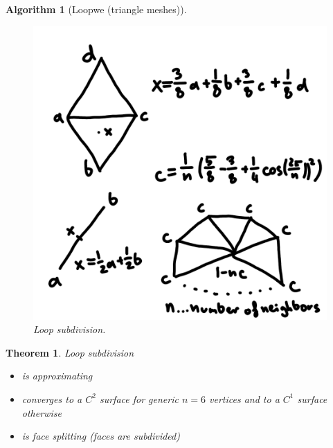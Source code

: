 \documentclass[]{article}
\newtheorem{theorem}{Theorem}
\newtheorem{algorithm}{Algorithm}
\begin{document}
\begin{algorithm}[Loopwe (triangle meshes)]
	\begin{figure}[h!]
		\centering
		\includegraphics[width=0.3\linewidth]{figures/loop}
		\caption{Loop subdivision.}
		\label{fig:loop}
	\end{figure}
\end{algorithm}

\begin{theorem}
	Loop subdivision
	\begin{itemize}
		\item is approximating
		\item converges to a $C^2$ surface for generic $n=6$ vertices and to a $C^1$ surface otherwise
		\item is face splitting (faces are subdivided)
	\end{itemize}
\end{theorem}
\end{document}
